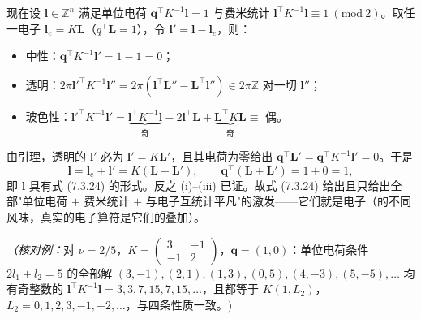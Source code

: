 现在设 $\pmb{l}\in\mathbb Z^n$ 满足单位电荷 $\pmb{q}^{\top}K^{-1}\pmb{l}=1$ 与费米统计 $\pmb{l}^{\top}K^{-1}\pmb{l}\equiv1\ (\mathrm{mod}\ 2)$。取任一电子 $\pmb{l}_e=K\pmb{L}$（$q^{\top}\pmb{L}=1$），令 $\pmb{l}'=\pmb{l}-\pmb{l}_e$，则：
\begin{itemize}
\item 中性：$\pmb{q}^{\top}K^{-1}\pmb{l}'=1-1=0$；
\item 透明：$2\pi\pmb{l}'^{\top}K^{-1}\pmb{l}''=2\pi(\pmb{l}^{\top}\pmb{L}''-\pmb{L}^{\top}\pmb{l}'')\in2\pi\mathbb Z$ 对一切 $\pmb{l}''$；
\item 玻色性：$\pmb{l}'^{\top}K^{-1}\pmb{l}'=\underbrace{\pmb{l}^{\top}K^{-1}\pmb{l}}_{\text{奇}}-2\pmb{l}^{\top}\pmb{L}+\underbrace{\pmb{L}^{\top}K\pmb{L}}_{\text{奇}}\equiv$ 偶。
\end{itemize}
由引理，透明的 $\pmb{l}'$ 必为 $\pmb{l}'=K\pmb{L}'$，且其电荷为零给出 $\pmb{q}^{\top}\pmb{L}'=\pmb{q}^{\top}K^{-1}\pmb{l}'=0$。于是
\begin{equation*}
\pmb{l}=\pmb{l}_e+\pmb{l}'=K(\pmb{L}+\pmb{L}'),\qquad
\pmb{q}^{\top}(\pmb{L}+\pmb{L}')=1+0=1 ,
\end{equation*}
即 $\pmb{l}$ 具有式 (7.3.24) 的形式。反之 (i)--(iii) 已证。故式 (7.3.24) 给出且只给出全部"单位电荷 $+$ 费米统计 $+$ 与电子互统计平凡"的激发——它们就是电子（的不同风味，真实的电子算符是它们的叠加）。

\emph{（核对例：}对 $\nu=2/5$，$K=\begin{pmatrix}3&-1\\-1&2\end{pmatrix}$，$\pmb{q}=(1,0)$：单位电荷条件 $2l_1+l_2=5$ 的全部解 $(3,-1),(2,1),(1,3),(0,5),(4,-3),(5,-5),\dots$ 均有奇整数的 $\pmb{l}^{\top}K^{-1}\pmb{l}=3,3,7,15,7,15,\dots$，且都等于 $K(1,L_2)$，$L_2=0,1,2,3,-1,-2,\dots$，与四条性质一致。$)$

